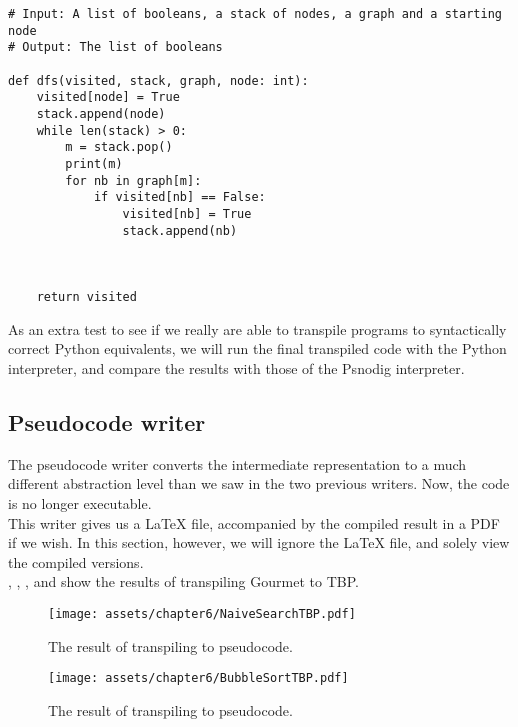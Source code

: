 \begin{lstlisting}[caption={The result of transpiling \Cref{dfsGourmet} to Python.}, captionpos=b, label={dfsPython}]
# Input: A list of booleans, a stack of nodes, a graph and a starting node
# Output: The list of booleans

def dfs(visited, stack, graph, node: int):
    visited[node] = True
    stack.append(node)
    while len(stack) > 0:
        m = stack.pop()
        print(m)
        for nb in graph[m]:
            if visited[nb] == False:
                visited[nb] = True
                stack.append(nb)



    return visited
\end{lstlisting}

As an extra test to see if we really are able to transpile programs to syntactically correct Python equivalents, we will run the final transpiled code with the Python interpreter, and compare the results with those of the Psnodig interpreter. \\


\subsection{Pseudocode writer}

The pseudocode writer converts the intermediate representation to a much different abstraction level than we saw in the two previous writers. Now, the code is no longer executable. \\

This writer gives us a LaTeX file, accompanied by the compiled result in a PDF if we wish. In this section, however, we will ignore the LaTeX file, and solely view the compiled versions. \\

, , , and  show the results of transpiling Gourmet to TBP. \\

\begin{figure}[ht!]
    \centering
    \texttt{[image: assets/chapter6/NaiveSearchTBP.pdf]}
    \caption{The result of transpiling  to pseudocode.}
    \label{naiveSearchTBP}
\end{figure}

\begin{figure}[ht!]
    \centering
    \texttt{[image: assets/chapter6/BubbleSortTBP.pdf]}
    \caption{The result of transpiling  to pseudocode.}
    \label{bubbleSortTBP}
\end{figure}

